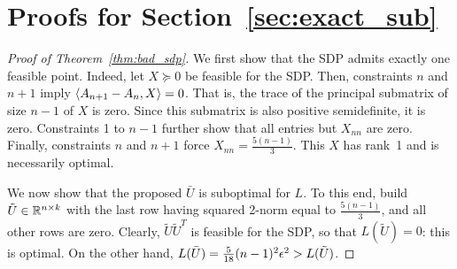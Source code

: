 \section{Proofs for Section~\ref{sec:exact_sub}}\label{app:exact_sub}
\begin{proof}[Proof of Theorem~\ref{thm:bad_sdp}]
	We first show that the SDP admits exactly one feasible point. Indeed, let $X \succeq 0$ be feasible for the SDP. Then, constraints $n$ and $n+1$ imply $\left\langle A_{n+1} - A_{n}, X \right\rangle = 0$. That is, the trace of the principal submatrix of size $n-1$ of $X$ is zero. Since this submatrix is also positive semidefinite, it is zero. Constraints 1 to $n-1$ further show that all entries but $X_{nn}$ are zero. Finally, constraints $n$ and ${n+1}$ force $X_{nn} = \frac{5(n-1)}{3}$. This $X$ has rank~1 and is necessarily optimal.
	
	We now show that the proposed $\bar U$ is suboptimal for $L$. To this end, build $\tilde U \in \mathbb{R}^{n\times k}$ with the last row having squared 2-norm equal to $\frac{5(n-1)}{3}$, and all other rows are zero. Clearly, $\tilde U\tilde U^T$ is feasible for the SDP, so that $L(\tilde U) = 0$: this is optimal. On the other hand, $L(\bar U) = \frac{5}{18}(n-1)^2\epsilon^2 > L(\tilde U)$.
	

\end{proof}

